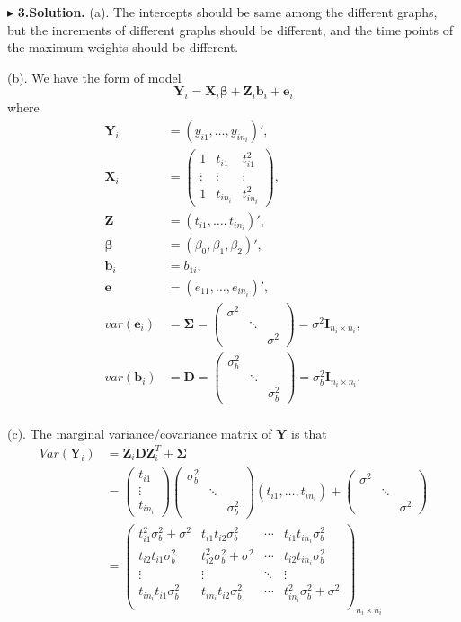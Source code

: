 \documentclass[letterpaper, 12pt]{article}
\newcommand{\ba}{$$\begin{aligned}}
\newcommand{\ea}{\end{aligned}$$}
\begin{document}
$\blacktriangleright$ \textbf{3.\quad Solution.} 
(a). The intercepts should be same among the different graphs, but the increments of different graphs should be different, and the time points of the maximum weights should be different.


(b). We have the form of model 
$$
\bm{Y}_i=\bm{X}_i\bm{\beta}+\bm{Z}_i\bm{b}_i+\bm{e}_i
$$
where 
\ba
\bm{Y}_i&=(y_{i1},\dots,y_{in_i})',\\
\bm{X}_i&=\left(\begin{matrix}
1&t_{i1}&t_{i1}^2\\
\vdots&\vdots&\vdots\\
1&t_{in_i}&t_{in_i}^2\end{matrix}\right),\\
\bm{Z}&=(t_{i1},\dots,t_{in_i})',\\
\bm{\beta}&=(\beta_0,\beta_1,\beta_2)',\\
\bm{b}_i&=b_{1i},\\
\bm{e}&=(e_{11},\dots,e_{in_i})',\\
var(\bm{e}_i)&=\bm{\Sigma}=\left(\begin{matrix}
\sigma^2\\
&\ddots\\
&&\sigma^2\end{matrix}\right)=\sigma^2\bm{I}_{n_i\times n_i},\\
var(\bm{b}_i)&=\bm{D}=\left(\begin{matrix}
\sigma_b^2\\
&\ddots\\
&&\sigma_b^2\end{matrix}\right)=\sigma_b^2\bm{I}_{n_i\times n_i},\\
\ea


(c). The marginal variance/covariance matrix of $\bm{Y}$ is that
\ba
Var(\bm{Y}_i)&=\bm{Z}_i\bm{DZ}_i^T+\bm{\Sigma}\\
&=\left(\begin{matrix}
t_{i1}\\
\vdots\\
t_{in_i}\end{matrix}\right)
\left(\begin{matrix}
\sigma_b^2\\
&\ddots\\
&&\sigma_b^2\end{matrix}\right)
(t_{i1},\dots,t_{in_i})+\left(\begin{matrix}
\sigma^2\\
&\ddots\\
&&\sigma^2\end{matrix}\right)\\
&=\left(\begin{matrix}
t_{i1}^2\sigma_b^2+\sigma^2&t_{i1}t_{i2}\sigma_b^2&\cdots&t_{i1}t_{in_i}\sigma_b^2\\
t_{i2}t_{i1}\sigma_b^2&t_{i2}^2\sigma_b^2+\sigma^2&\cdots&t_{i2}t_{in_i}\sigma_b^2\\
\vdots&\vdots&\ddots&\vdots\\
t_{in_i}t_{i1}\sigma_b^2&t_{in_i}t_{i2}\sigma_b^2&\cdots&t_{in_i}^2\sigma_b^2+\sigma^2\\
\end{matrix}\right)_{n_i\times n_i}
\ea
\end{document}
